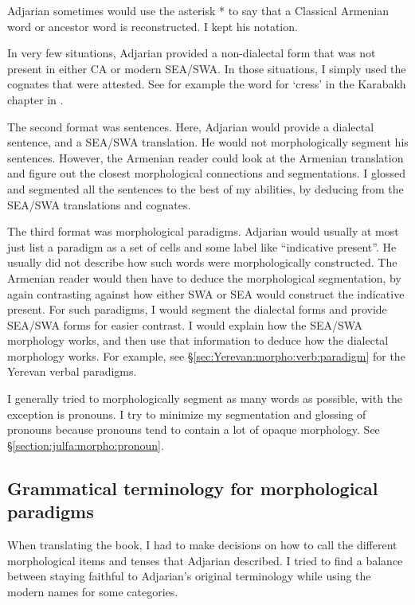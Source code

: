 \documentclass[output=paper]{langscibook}
\begin{document}
Adjarian sometimes would use the asterisk * to say that a Classical Armenian word or ancestor word is reconstructed. I kept his notation. 


In very few situations, Adjarian provided a non-dialectal form that was not present in either CA or modern SEA/SWA. In those situations, I simply used the cognates that were attested. See for example the word for `cress' in the Karabakh chapter in . 


The second format was   sentences. Here, Adjarian would provide a dialectal sentence, and a SEA/SWA translation. He would not morphologically segment his sentences. However, the Armenian reader could look at the Armenian translation and figure out the closest morphological connections and segmentations. I glossed and segmented all the sentences to the best of my abilities, by deducing from the SEA/SWA translations and cognates. 

The third format was morphological paradigms. Adjarian would usually at most just list a paradigm as a set of cells and some label like ``indicative present''. He usually did not describe how such words were morphologically constructed. The Armenian reader would then have to deduce the morphological segmentation, by again contrasting against how either SWA or SEA would construct the indicative present. For such paradigms, I would segment the dialectal forms and provide SEA/SWA forms for easier contrast. I would   explain how the SEA/SWA morphology works, and then use that information to deduce how the dialectal morphology works. For example, see \S\ref{sec:Yerevan:morpho:verb:paradigm} for the Yerevan verbal paradigms.

I generally tried to morphologically segment   as many words as possible, with the exception is pronouns. I try to minimize my segmentation and glossing of pronouns because pronouns tend to contain a lot of opaque morphology. See \S\ref{section:julfa:morpho:pronoun}. 

\subsection{Grammatical terminology for morphological paradigms}\label{sec:HossepIntro:translation:grammatical terms}
 
When translating the book, I had to make decisions on how to call the different morphological items and tenses that Adjarian described. I tried to find a balance between staying faithful to Adjarian's original terminology while using the modern names for some categories. 
\end{document}
